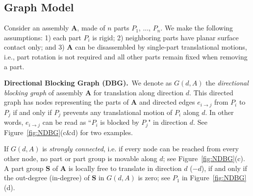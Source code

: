 \subsection{Graph Model}


Consider an assembly $\mathbf{A}$, made of $n$ parts $P_1$, $...$, $P_n$.
We make the following assumptions:
1) each part $P_i$ is rigid; 
2) neighboring parts have planar surface contact only; and 
3) $\mathbf{A}$ can be disassembled by single-part translational motions, i.e., part rotation is not required and all other parts remain fixed when removing a part.



\vspace*{1.0mm}
\noindent
{\bf Directional Blocking Graph (DBG).}\  
We denote as $G(d, A)$ the {\em directional blocking graph} of assembly $\mathbf{A}$ for translation along direction $d$. 
This directed graph has nodes representing the parts of $\mathbf{A}$ and directed edges $e_{i \rightarrow j}$ from $P_i$ to $P_j$  if and only if $P_j$ prevents any translational motion of $P_i$ along $d$. 
In other words, $e_{i \rightarrow j}$ can be read as ``$P_i$  is blocked by $P_j$" in direction $d$. 
See Figure~\ref{fig:NDBG}(c\&d) for two examples.

If $G(d, A)$ is {\em strongly connected}, i.e. if every node can be reached from every other node, no part or part group is movable along $d$; see Figure~\ref{fig:NDBG}(c). 
A part group $\mathbf{S}$ of $\mathbf{A}$ is locally free to translate in direction $d$ ($-d$), if and only if the out-degree (in-degree) of $\mathbf{S}$ in $G(d, A)$ is zero; see $P_1$ in Figure~\ref{fig:NDBG}(d).


